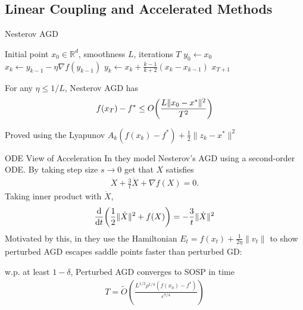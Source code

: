 \documentclass[10pt]{beamer}
\def \ve{\varepsilon}
\newcommand{\mg}[1]{\| #1 \|}
\renewcommand{\grad}{\nabla}
\newcommand{\1}{\mathbbm{1}}
\begin{document}
\subsection{Linear Coupling and Accelerated Methods}
\begin{frame}{Nesterov AGD}
    \begin{algorithm}[H]
\caption{Nesterov Accelerated Gradient Descent}
\begin{algorithmic}[1]
\Require Initial point $x_0 \in \mathbb{R}^d$, smoothness $L$, iterations $T$
\State $y_0 \gets x_0$
    \State $x_k \gets y_{k-1} - \eta \grad f(y_{k-1})$ 
    \State $y_k \gets x_k + \frac{k-1}{k+2} (x_k -x_{k-1})$
\EndFor
\State \Return $x_{T+1}$
\end{algorithmic}
\end{algorithm}
\begin{theorem}[]
    For any $\eta \leq 1/L$, Nesterov AGD has 
    \begin{align*}
        f(x_T) - f^* \leq O\qty(\frac{L\mg{x_0-x^*}^2}{T^2})
    \end{align*}
\end{theorem}
Proved using the Lyapunov $A_k(f(x_k) - f^*) + \frac 12 \mg{z_k-x^*}^2$
\end{frame}
\begin{frame}{ODE View of Acceleration}
    In \cite{su2016differential} they model Nesterov's AGD using a second-order ODE. By taking step size $s \to 0$ get that $X$ satisfies
    \begin{align*}
        \ddot{X} + \frac{3}{t} \dot{X} + \grad f(X) = 0.
    \end{align*}
    Taking inner product with $\dot{X}$,
    \begin{align*}
        \dv{t} (\frac12 \mg{\dot{X}}^2 + f(X)) = -\frac{3}{t} \mg{\dot{X}}^2
    \end{align*}
    Motivated by this, in \cite{jin2017accelerated} they use the Hamiltonian $E_t = f(x_t) + \frac{1}{2\eta} \mg{v_t}$ to show perturbed AGD escapes saddle points faster than perturbed GD:
    \begin{theorem}[]
        w.p. at least $1-\delta$, Perturbed AGD converges to SOSP in time
        \begin{align*}
            T = \tilde{O} \left(\frac{L^{1/2} \rho^{1/4} (f(x_0) - f^*)}{\ve^{7/4}} \right)
        \end{align*}
    \end{theorem}
\end{frame}
\end{document}
